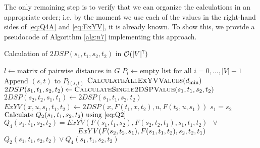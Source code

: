 The only remaining step is to verify that we can organize the calculations in an appropriate order; i.e. by the moment we use each of the values in the right-hand sides of \eqref{eq:Q4A} and \eqref{eq:ExYV}, it is already known. To show this, we provide a pseudocode of Algorithm \ref{alg:n7} implementing this approach.

\begin{algorithm}
\caption{Calculation of $2DSP(s_1, t_1, s_2, t_2)$ in $\mathcal{O}(|V|^7)$} \label{alg:n7}
\begin{algorithmic}[1]
\State $l \gets \text{matrix of pairwise distances in }G$
\State $P_i \gets \text{empty list for all }i = 0, \ldots, |V|-1$
    \State $\text{Append }(s, t)\text{ to }P_{l(s, t)}$
\EndFor
{}
    \State $\textsc{CalculateAllExYVValues}(d_{\min})$ \label{line:calcExYV}
                \State $2DSP(s_1, t_1, s_2, t_2) \gets \textsc{CalculateSingle2DSPValue}(s_1, t_1, s_2, t_2)$
                \State $2DSP(s_2, t_2, s_1, t_1) \gets 2DSP(s_1, t_1, s_2, t_2)$
            \EndFor
        \EndFor
    \EndFor
\EndFor
\EndProcedure
\Statex
{}
                \State $ExYV(x,u,s_1,t_1,t_2) \gets 2DSP(x, F(t_1,x,t_2), u, F(t_2,u,s_1))$
            \EndFor
        \EndFor
    \EndFor
\EndProcedure
\Statex
{}
    \State \Return $s_1 = s_2$
    \State {}
\Else
    \State $\text{Calculate }Q_2(s_1, t_1, s_2, t_2)\text{ using \eqref{eq:Q2}}$
    \State $Q_4(s_1, t_1, s_2, t_2) = ExYV(F(s_1, t_1, s_2), F(s_2, t_2, t_1), s_1, t_1, t_2)\enspace\vee\enspace$ 
    \Statex $\hspace{3.65cm}ExYV(F(s_2, t_2, s_1), F(s_1, t_1, t_2), s_2, t_2, t_1)$ \label{line:useExYV}
    \State \Return $Q_2(s_1, t_1, s_2, t_2) \vee Q_4(s_1, t_1, s_2, t_2)$
\EndIf
\EndProcedure
\end{algorithmic}
\end{algorithm}

